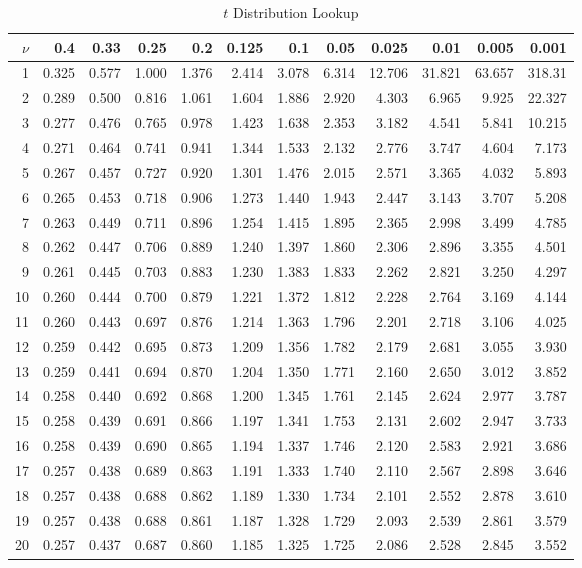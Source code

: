 \begin{table}
\centering 
\caption{$t$ Distribution Lookup}
\begin{tabular}
      {|r||rrr|rrr|rrr|rr|}
\hline
$\nu$&0.4&0.33&0.25&0.2&0.125&0.1&0.05&0.025&0.01&0.005
     &0.001\\
    \hline\hline
 1&0.325&0.577&1.000&1.376&2.414&3.078&6.314&12.706&31.821&63.657&318.31 \\
 2&0.289&0.500&0.816&1.061&1.604&1.886&2.920&4.303&6.965&9.925&22.327 \\
 3&0.277&0.476&0.765&0.978&1.423&1.638&2.353&3.182&4.541&5.841&10.215 \\
 4&0.271&0.464&0.741&0.941&1.344&1.533&2.132&2.776&3.747&4.604&7.173 \\
 5&0.267&0.457&0.727&0.920&1.301&1.476&2.015&2.571&3.365&4.032&5.893 \\
 \hline
 6&0.265&0.453&0.718&0.906&1.273&1.440&1.943&2.447&3.143&3.707&5.208 \\
 7&0.263&0.449&0.711&0.896&1.254&1.415&1.895&2.365&2.998&3.499&4.785 \\
 8&0.262&0.447&0.706&0.889&1.240&1.397&1.860&2.306&2.896&3.355&4.501 \\
 9&0.261&0.445&0.703&0.883&1.230&1.383&1.833&2.262&2.821&3.250&4.297 \\
10&0.260&0.444&0.700&0.879&1.221&1.372&1.812&2.228&2.764&3.169&4.144 \\
\hline
11&0.260&0.443&0.697&0.876&1.214&1.363&1.796&2.201&2.718&3.106&4.025 \\
12&0.259&0.442&0.695&0.873&1.209&1.356&1.782&2.179&2.681&3.055&3.930 \\
13&0.259&0.441&0.694&0.870&1.204&1.350&1.771&2.160&2.650&3.012&3.852 \\
14&0.258&0.440&0.692&0.868&1.200&1.345&1.761&2.145&2.624&2.977&3.787 \\
15&0.258&0.439&0.691&0.866&1.197&1.341&1.753&2.131&2.602&2.947&3.733 \\
\hline
16&0.258&0.439&0.690&0.865&1.194&1.337&1.746&2.120&2.583&2.921&3.686 \\
17&0.257&0.438&0.689&0.863&1.191&1.333&1.740&2.110&2.567&2.898&3.646 \\
18&0.257&0.438&0.688&0.862&1.189&1.330&1.734&2.101&2.552&2.878&3.610 \\
19&0.257&0.438&0.688&0.861&1.187&1.328&1.729&2.093&2.539&2.861&3.579 \\
20&0.257&0.437&0.687&0.860&1.185&1.325&1.725&2.086&2.528&2.845&3.552 \\

\end{tabular}
\end{table}
